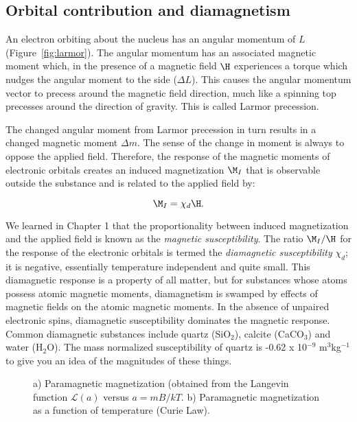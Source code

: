 \subsection{Orbital contribution and diamagnetism}
\label{sect:dia}


An electron orbiting about the nucleus has an angular momentum of $L$ (Figure~\ref{fig:larmor}).  The angular momentum  has an associated magnetic moment which, in the presence of   a magnetic field $\H$ experiences  a torque which nudges the angular moment to the side ($\Delta L$).  This causes the angular momentum vector to precess around the magnetic field direction, much like a spinning top precesses around the direction of gravity.  This is called 
Larmor precession.  

 The changed angular moment from Larmor precession  in turn results in a   changed
magnetic moment $\Delta m$.   The sense of the change in moment is always to oppose the applied field.
Therefore, the response of  the magnetic moments of electronic orbitals creates an induced magnetization $\M_I$ that is observable outside
the substance and is related to the applied field by: 

$$
\M_I=\chi_d \H.
$$

\noindent 
We learned in Chapter 1 that the proportionality between induced magnetization and the applied field    is known as the  
%
{\it magnetic susceptibility}.
The ratio $\M_I/\H $ for the response of the electronic orbitals is  termed the 
{\it diamagnetic susceptibility\/} $\chi_d$;  it is negative, 
essentially temperature independent and quite small. This diamagnetic
response is a property of all matter, but for substances whose atoms possess atomic magnetic moments,
diamagnetism is swamped by effects of magnetic fields on the atomic magnetic moments.
  In the absence of unpaired electronic spins, diamagnetic susceptibility dominates the  magnetic response.  Common diamagnetic substances include quartz (SiO$_2$), calcite (CaCO$_3$) and water (H$_2$O).   The mass normalized susceptibility of  quartz is -0.62 x 10$^{-9}$ m$^3$kg$^{-1}$ to give you an idea of the magnitudes of  these things. 

\begin{figure}[htb]
\epsfxsize 14cm
\centering {}
\caption{a) Paramagnetic magnetization (obtained from the Langevin function $\mathcal{L}(a)$ versus $a= mB/kT$. b) Paramagnetic magnetization as a function of temperature (Curie Law).}
\label{fig:para}
\end{figure}


